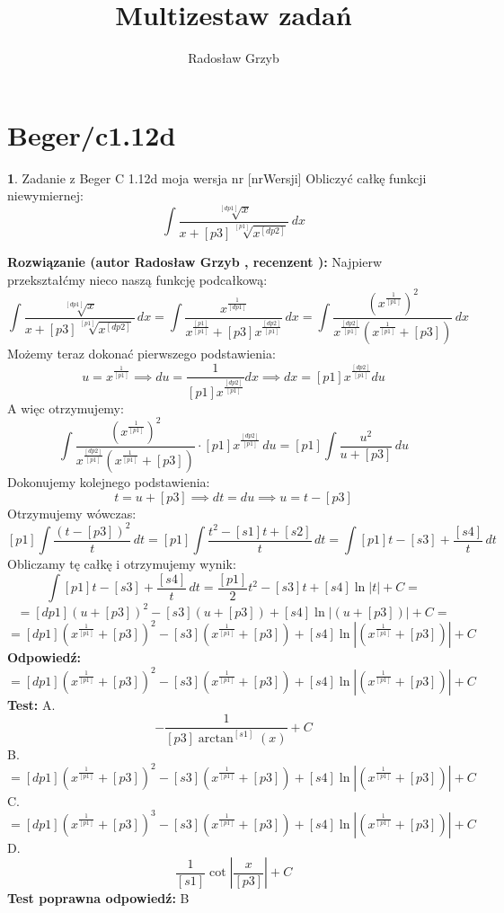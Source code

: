 \documentclass[12pt, a4paper]{article}
\title{Multizestaw zadań}
\author{Radosław Grzyb}
\date{}
\theoremstyle{definition} %
\newtheorem{zad}{}
\newcommand{\kategoria}[1]{\section{#1}} %
\newcommand{\zadStart}[1]{\begin{zad}#1\newline} %
\newcommand{\zadStop}{\end{zad}}   %
\newcommand{\rozwStart}[2]{\noindent \textbf{Rozwiązanie (autor #1 , recenzent #2): }\newline} %
\newcommand{\rozwStop}{\newline}                                            %
\newcommand{\odpStart}{\noindent \textbf{Odpowiedź:}\newline}    %
\newcommand{\odpStop}{\newline}                                             %
\newcommand{\testStart}{\noindent \textbf{Test:}\newline} %
\newcommand{\testStop}{\newline} %
\newcommand{\kluczStart}{\noindent \textbf{Test poprawna odpowiedź:}\newline} %
\newcommand{\kluczStop}{\newline} %
\begin{document}
\maketitle
\kategoria{Beger/c1.12d}
\zadStart{Zadanie z Beger C 1.12d moja wersja nr [nrWersji]}
Obliczyć całkę funkcji niewymiernej:
$$\int \frac{\sqrt[[dp1]]{x}}{x+[p3]\sqrt[[p1]]{x^{[dp2]}}}\,dx$$
\zadStop
\rozwStart{Radosław Grzyb}{}
Najpierw przekształćmy nieco naszą funkcję podcałkową:
$$\int \frac{\sqrt[[dp1]]{x}}{x+[p3]\sqrt[[p1]]{x^{[dp2]}}}\,dx=\int \frac{x^{\frac{1}{[dp1]}}}{x^{\frac{[p1]}{[p1]}}+[p3]x^{\frac{[dp2]}{[p1]}}}\,dx=\int \frac{(x^{\frac{1}{[p1]}})^{2}}{x^{\frac{[dp2]}{[p1]}}(x^{\frac{1}{[p1]}}+[p3])}\,dx$$
Możemy teraz dokonać pierwszego podstawienia:
$$u=x^{\frac{1}{[p1]}}\implies du=\frac{1}{[p1]x^{\frac{[dp2]}{[p1]}}}dx\implies dx=[p1]x^{\frac{[dp2]}{[p1]}}du$$
A więc otrzymujemy:
$$\int \frac{(x^{\frac{1}{[p1]}})^{2}}{x^{\frac{[dp2]}{[p1]}}(x^{\frac{1}{[p1]}}+[p3])}\cdot[p1]x^{\frac{[dp2]}{[p1]}}\,du=
[p1]\int\frac{u^2}{u+[p3]} \,du$$
Dokonujemy kolejnego podstawienia:
$$t=u+[p3]\implies dt=du \implies u=t-[p3]$$
Otrzymujemy wówczas:
$$[p1]\int\frac{(t-[p3])^2}{t} \,dt=[p1]\int\frac{t^{2}-[s1]t+[s2]}{t} \,dt=\int[p1]t-[s3]+\frac{[s4]}{t} \,dt$$
Obliczamy tę całkę i otrzymujemy wynik:
$$\int[p1]t-[s3]+\frac{[s4]}{t} \,dt=\frac{[p1]}{2}t^{2}-[s3]t+[s4]\ln|t|+C=$$
$$=[dp1](u+[p3])^{2}-[s3](u+[p3])+[s4]\ln|(u+[p3])|+C=$$
$$=[dp1](x^{\frac{1}{[p1]}}+[p3])^{2}-[s3](x^{\frac{1}{[p1]}}+[p3])+[s4]\ln|(x^{\frac{1}{[p1]}}+[p3])|+C$$
\rozwStop
\odpStart
$$=[dp1](x^{\frac{1}{[p1]}}+[p3])^{2}-[s3](x^{\frac{1}{[p1]}}+[p3])+[s4]\ln|(x^{\frac{1}{[p1]}}+[p3])|+C$$
\odpStop
\testStart
A.$$-\frac{1}{[p3]\arctan^{[s1]}(x)}+C$$
B.$$=[dp1](x^{\frac{1}{[p1]}}+[p3])^{2}-[s3](x^{\frac{1}{[p1]}}+[p3])+[s4]\ln|(x^{\frac{1}{[p1]}}+[p3])|+C$$
C.$$=[dp1](x^{\frac{1}{[p1]}}+[p3])^{3}-[s3](x^{\frac{1}{[p1]}}+[p3])+[s4]\ln|(x^{\frac{1}{[p1]}}+[p3])|+C$$
D.$$\frac{1}{[s1]}\cot|\frac{x}{[p3]}|+C$$
\testStop
\kluczStart
B
\kluczStop
\end{document}
